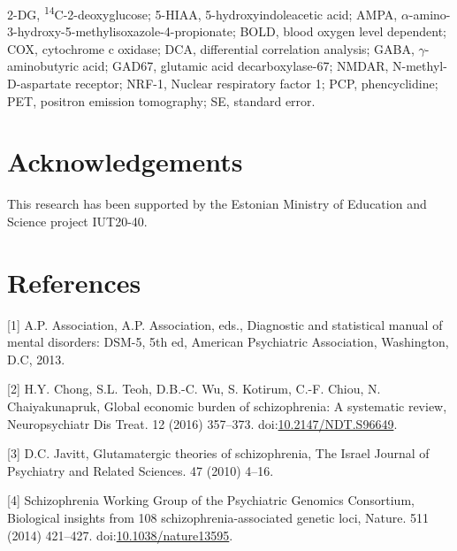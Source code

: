 \documentclass[man]{apa6}
\begin{document}
2-DG, \textsuperscript{14}C-2-deoxyglucose; 5-HIAA, 5-hydroxyindoleacetic acid; AMPA, \(\alpha\)-amino-3-hydroxy-5-methylisoxazole-4-propionate; BOLD, blood oxygen level dependent;
COX, cytochrome c oxidase; DCA, differential correlation analysis; GABA, \(\gamma\)-aminobutyric acid; GAD67, glutamic acid decarboxylase-67; NMDAR, N-methyl-D-aspartate receptor; NRF-1, Nuclear respiratory factor 1; PCP, phencyclidine; PET, positron emission tomography; SE, standard error.

\hypertarget{acknowledgements}{%
\section{Acknowledgements}\label{acknowledgements}}

This research has been supported by the Estonian Ministry of Education and Science project IUT20-40.

\pagebreak

\hypertarget{references}{%
\section{References}\label{references}}

\hypertarget{refs}{}
\leavevmode\hypertarget{ref-americanpsychiatricassociationDiagnosticStatisticalManual2013}{}%
{[}1{]} A.P. Association, A.P. Association, eds., Diagnostic and statistical manual of mental disorders: DSM-5, 5th ed, American Psychiatric Association, Washington, D.C, 2013.

\leavevmode\hypertarget{ref-chongGlobalEconomicBurden2016}{}%
{[}2{]} H.Y. Chong, S.L. Teoh, D.B.-C. Wu, S. Kotirum, C.-F. Chiou, N. Chaiyakunapruk, Global economic burden of schizophrenia: A systematic review, Neuropsychiatr Dis Treat. 12 (2016) 357--373. doi:\href{https://doi.org/10.2147/NDT.S96649}{10.2147/NDT.S96649}.

\leavevmode\hypertarget{ref-javittGlutamatergicTheoriesSchizophrenia2010}{}%
{[}3{]} D.C. Javitt, Glutamatergic theories of schizophrenia, The Israel Journal of Psychiatry and Related Sciences. 47 (2010) 4--16.

\leavevmode\hypertarget{ref-schizophreniaworkinggroupofthepsychiatricgenomicsconsortiumBiologicalInsights1082014}{}%
{[}4{]} Schizophrenia Working Group of the Psychiatric Genomics Consortium, Biological insights from 108 schizophrenia-associated genetic loci, Nature. 511 (2014) 421--427. doi:\href{https://doi.org/10.1038/nature13595}{10.1038/nature13595}.
\end{document}
